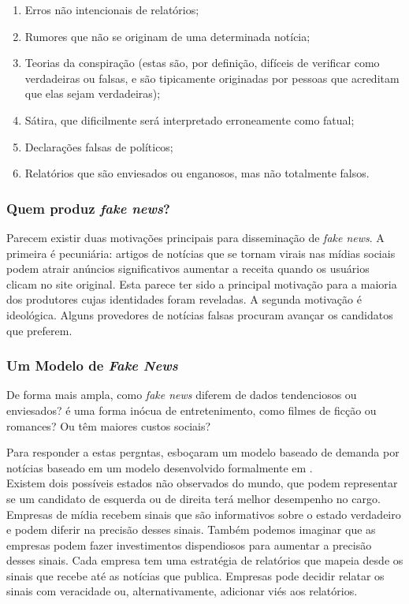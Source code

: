 \begin{enumerate}
    \item Erros não intencionais de relatórios;
    \item Rumores que não se originam de uma determinada notícia;
    \item Teorias da conspiração (estas são, por definição, difíceis de verificar como verdadeiras ou falsas, e são tipicamente originadas por pessoas que acreditam que elas sejam verdadeiras);
    \item Sátira, que dificilmente será interpretado erroneamente como fatual;
    \item Declarações falsas de políticos;
    \item Relatórios que são enviesados ou enganosos, mas não totalmente falsos.
\end{enumerate}


\subsubsection{Quem produz \textit{fake news}?}

Parecem existir duas motivações principais para disseminação de \textit{fake news}. A primeira é pecuniária: artigos de notícias que se tornam virais nas mídias sociais podem atrair anúncios significativos aumentar a receita quando os usuários clicam no site original. Esta parece ter sido a principal motivação para a maioria dos produtores cujas identidades foram reveladas. A segunda motivação é ideológica. Alguns provedores de notícias falsas procuram avançar os candidatos que preferem.


\subsubsection{Um Modelo de \textit{Fake News}}

De forma mais ampla, como \textit{fake news} diferem de dados tendenciosos ou enviesados? é uma forma inócua de entretenimento, como filmes de ficção ou romances? Ou têm maiores custos sociais? 

Para responder a estas pergntas, \cite{allcot2017} esboçaram um modelo baseado de demanda por notícias baseado em um modelo desenvolvido formalmente em \cite{gentzkow2016}. \\

Existem dois possíveis estados não observados do mundo, que podem representar se um candidato de esquerda ou de direita terá melhor desempenho no cargo. Empresas de mídia recebem sinais que são informativos sobre o estado verdadeiro e podem diferir na
precisão desses sinais. Também podemos imaginar que as empresas podem fazer investimentos dispendiosos para aumentar a precisão desses sinais. Cada empresa tem uma estratégia de relatórios que mapeia desde os sinais que recebe até as notícias que publica. Empresas pode decidir relatar os sinais com veracidade ou, alternativamente, adicionar viés aos relatórios. \\

